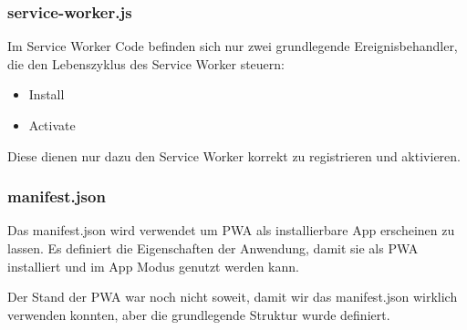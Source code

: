 
\subsubsection{service-worker.js}
Im Service Worker Code befinden sich nur zwei grundlegende Ereignisbehandler, die den Lebenszyklus des Service Worker steuern:
\begin{itemize}
  \item Install 
  \item Activate
\end{itemize}

\noindent
Diese dienen nur dazu den Service Worker korrekt zu registrieren und aktivieren.

%

\subsubsection{manifest.json}
Das manifest.json wird verwendet um PWA als installierbare App erscheinen zu lassen. Es definiert die Eigenschaften der Anwendung, damit sie als PWA installiert und im App Modus genutzt werden kann.

\noindent
Der Stand der PWA war noch nicht soweit, damit wir das manifest.json wirklich verwenden konnten, 
aber die grundlegende Struktur wurde definiert.



